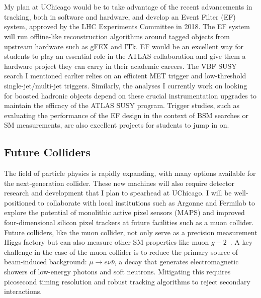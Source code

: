 \documentclass[10pt,a4paper,sans]{moderncv/moderncv} %
\begin{document}
\\
\\
My plan at UChicago would be to take advantage of the recent advancements in tracking, both in software and hardware, and develop an Event Filter (EF) system, approved by the LHC Experiments Committee in 2018. The EF system will run offline-like reconstruction algorithms around tagged objects from upstream hardware such as gFEX and ITk. EF would be an excellent way for students to play an essential role in the ATLAS collaboration and give them a hardware project they can carry in their academic careers. The VBF SUSY search I mentioned earlier relies on an efficient MET trigger and low-threshold single-jet/multi-jet triggers. Similarly, the analyses I currently work on looking for boosted hadronic objects depend on these crucial instrumentation upgrades to maintain the efficacy of the ATLAS SUSY program. Trigger studies, such as evaluating the performance of the EF design in the context of BSM searches or SM measurements, are also excellent projects for students to jump in on.

\subsection{Future Colliders}
The field of particle physics is rapidly expanding, with many options available for the next-generation collider. These new machines will also require detector research and development that I plan to spearhead at UChicago. I will be well-positioned to collaborate with local institutions such as Argonne and Fermilab to explore the potential of monolithic active pixel sensors (MAPS) and improved four-dimensional silicon pixel trackers at future facilities such as a muon collider. Future colliders, like the muon collider, not only serve as a precision measurement Higgs factory but can also measure other SM properties like muon $g-2$~\cite{Chakraborti:2021dli}. A key challenge in the case of the muon collider is to reduce the primary source of beam-induced background: $\mu \to e \nu \bar{\nu}$, a decay that generates electromagnetic showers of low-energy photons and soft neutrons. Mitigating this requires picosecond timing resolution and robust tracking algorithms to reject secondary interactions.
\end{document}
